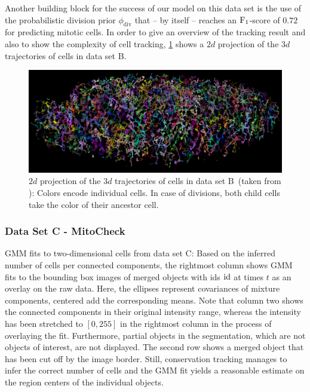 Another building block for the success of our model on this data set is the use of the probabilistic
division prior $\phi_{\text{div}}$ that -- by itself -- reaches an $\operatorname{F}_{1}$-score of $0.72$ for
predicting mitotic cells. In order to give an overview of the tracking result and also to show the
complexity of cell tracking, \cref{fig:gmm-result-b-projection} shows a $2d$ projection of the $3d$
trajectories of cells in data set B.

\begin{figure}
    \centering
    \includegraphics[width=\textwidth]{images/gmm/results/B/projection.png}
    \caption[$2d$ projection of trajectories in data set B]{$2d$ projection of the $3d$ trajectories of cells in data set B~(taken from
        \citealp{schiegg_13_conservation}): Colors encode individual cells. In case of divisions,
        both child cells take the color of their ancestor cell.}
    \label{fig:gmm-result-b-projection}
\end{figure}



\subsubsection{Data Set C - MitoCheck}
\def\imagetop#1{\vtop{\null\hbox{#1}}}
\newlength\tablemathtext
\settototalheight{}
\begin{table}
    \centering
    \scalebox{0.85}{
        
    }
    \caption[GMM fits to two-dimensional cells]{\small GMM fits to two-dimensional cells from data set
        C: Based on the inferred number of cells per connected components, the rightmost column
        shows GMM fits to the bounding box images of merged objects with ids $\operatorname{id}$ at times $t$ as an overlay
        on the raw data. Here, the ellipses represent covariances of mixture components, centered
        add the corresponding means. Note that
        column two shows the connected components in their original intensity range, whereas the intensity
        has been stretched to $[0,255]$ in the rightmost column in the process of overlaying the
        fit. Furthermore, partial objects in the segmentation, which are not objects of interest, are not
        displayed. The second row shows a merged object that has been cut off by the image border. Still,
        conservation tracking manages to infer the correct number of cells and the GMM fit yields a
        reasonable estimate on the region centers of the individual objects.}
   \label{tab:gmm-results-c-fits}
\end{table}

